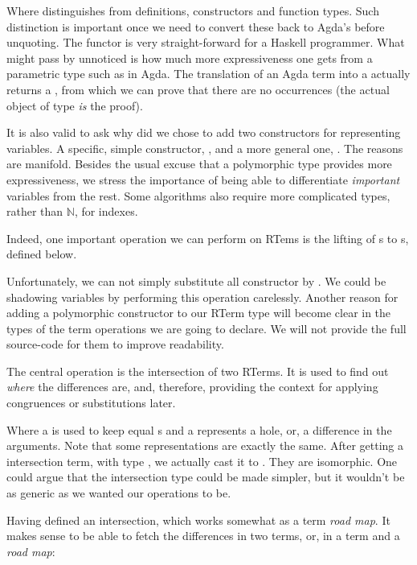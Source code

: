 Where  distinguishes from definitions, constructors and function types. Such
distinction is important once we need to convert these back to Agda's  before unquoting.
The  functor is very straight-forward for a Haskell programmer. What might pass by unnoticed
is how much more expressiveness one gets from a parametric type such as  in Agda.
The translation of an Agda term into a  actually returns a , from which
we can prove that there are no  occurrences (the actual object of type  \emph{is} the proof).

It is also valid to ask why did we chose to add two constructors for representing variables.
A specific, simple constructor, , and a more general one, . The reasons are
manifold. Besides the usual excuse that a polymorphic type provides more expressiveness, we
stress the importance of being able to differentiate \emph{important} variables from the rest.
Some algorithms also require more complicated types, rather than $\mathbb{N}$, for indexes.

Indeed, one important operation we can perform on RTems is the lifting of s to s,
defined below.


Unfortunately, we can not simply substitute all  constructor by . We could
be shadowing variables by performing this operation carelessly. Another reason for adding a polymorphic
constructor to our RTerm type will become clear in the types of the term operations we are going to declare.
We will not provide the full source-code for them to improve readability. 

The central operation is the intersection of two RTerms. It is used to find out \emph{where}
the differences are, and, therefore, providing the context for applying congruences or substitutions later. 


Where a  is used to keep equal s and a  represents a hole, or,
a difference in the arguments. Note that some representations are exactly the same. After getting
a intersection term, with type , we actually cast it to .
They are isomorphic. One could argue that the intersection type could be made simpler, but it
wouldn't be as generic as we wanted our operations to be.

Having defined an intersection, which works somewhat as a term \emph{road map}. It makes sense to be
able to fetch the differences in two terms, or, in a term and a \emph{road map}:


